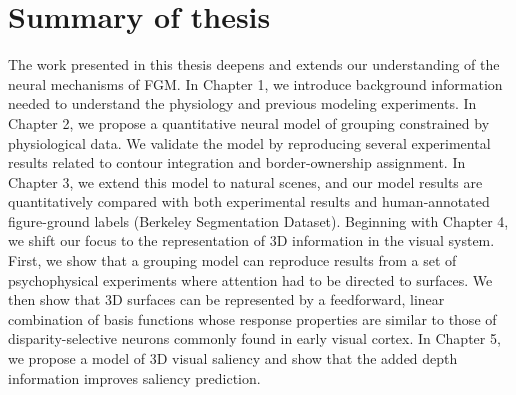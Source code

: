 \section{Summary of thesis} %

The work presented in this thesis deepens and extends our understanding of the neural mechanisms of FGM. In Chapter 1, we introduce background information needed to understand the physiology and previous modeling experiments. In Chapter 2, we propose a quantitative neural model of grouping constrained by physiological data. We validate the model by reproducing several experimental results related to contour integration and border-ownership assignment. In Chapter 3, we extend this model to natural scenes, and our model results are quantitatively compared with both experimental results and human-annotated figure-ground labels (Berkeley Segmentation Dataset). Beginning with Chapter 4, we shift our focus to the representation of 3D information in the visual system. First, we show that a grouping model can reproduce results from a set of psychophysical experiments where attention had to be directed to surfaces. We then show that 3D surfaces can be represented by a feedforward, linear combination of basis functions whose response properties are similar to those of disparity-selective neurons commonly found in early visual cortex. In Chapter 5, we propose a model of 3D visual saliency and show that the added depth information improves saliency prediction.

